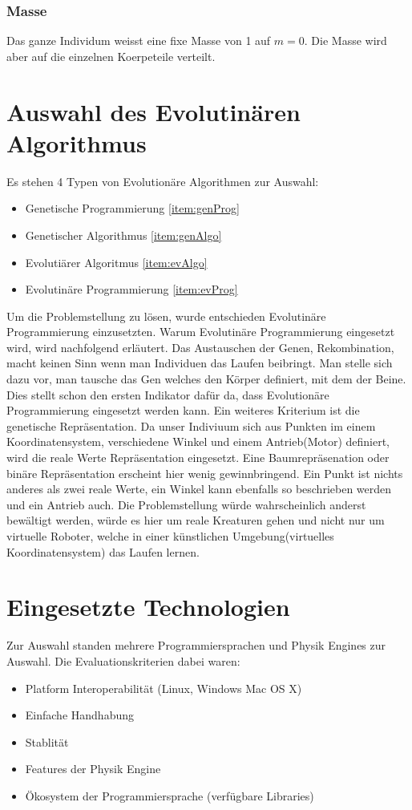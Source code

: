     \subsubsection{Masse}
    \label{subs:Masse}
      Das ganze Individum weisst eine fixe Masse von 1 auf \(m = 0\). Die Masse wird aber auf die einzelnen Koerpeteile verteilt.

  \section{Auswahl des Evolutinären Algorithmus}
    Es stehen 4 Typen von Evolutionäre Algorithmen zur Auswahl:
    \begin{itemize}
      \item Genetische Programmierung \ref{item:genProg}
      \item Genetischer Algorithmus \ref{item:genAlgo}
      \item Evolutiärer Algoritmus \ref{item:evAlgo}
      \item Evolutinäre Programmierung \ref{item:evProg}
    \end{itemize}
    Um die Problemstellung zu lösen, wurde entschieden Evolutinäre Programmierung einzusetzten.
    Warum Evolutinäre Programmierung eingesetzt wird, wird nachfolgend erläutert. Das Austauschen der Genen, Rekombination, macht keinen Sinn wenn man Individuen das Laufen beibringt.
    Man stelle sich dazu vor, man tausche das Gen welches den Körper definiert, mit dem der Beine. Dies stellt schon den ersten Indikator dafür da,
    dass Evolutionäre Programmierung eingesetzt werden kann. Ein weiteres Kriterium ist die genetische Repräsentation.
    Da unser Indiviuum sich aus Punkten im einem Koordinatensystem, verschiedene Winkel und einem Antrieb(Motor) definiert, wird die reale Werte Repräsentation eingesetzt.
    Eine Baumrepräsenation oder binäre Repräsentation erscheint hier wenig gewinnbringend. Ein Punkt ist nichts anderes als zwei reale Werte, ein Winkel kann ebenfalls so beschrieben werden und ein Antrieb auch.
    Die Problemstellung würde wahrscheinlich anderst bewältigt werden, würde es hier um reale Kreaturen gehen und nicht nur um virtuelle Roboter, welche in einer künstlichen Umgebung(virtuelles Koordinatensystem) das Laufen lernen.

  \section{Eingesetzte Technologien}
    Zur Auswahl standen mehrere Programmiersprachen und Physik Engines zur Auswahl. Die Evaluationskriterien dabei waren:
    \begin{itemize}
      \item Platform Interoperabilität (Linux, Windows Mac OS X)
      \item Einfache Handhabung
      \item Stablität
      \item Features der Physik Engine
      \item Ökosystem der Programmiersprache (verfügbare Libraries)
    \end{itemize}

